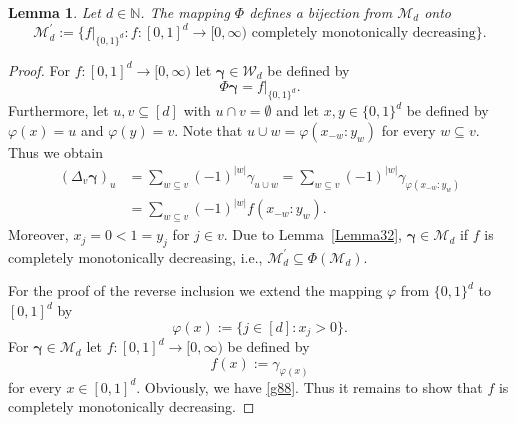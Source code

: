 \documentclass[10pt,a4paper]{amsart}
\newtheorem{lemma}{Lemma}
\newcommand{\M}  {\mathcal{M}}
\newcommand{\N}  {{\mathbb N}}
\newcommand{\W}  {\mathcal{W}}
\newcommand{\bg}{{\boldsymbol{\gamma}}}
\begin{document}
\begin{lemma}\label{Lemma33}
Let $d\in \N$.
The mapping $\Phi$ defines a bijection from $\M_d$ onto 
\[
\M_d^\prime := \{ f|_{\{0,1\}^d} : 
\text{$f \colon [0,1]^d \to {[0,\infty)}$ completely monotonically
decreasing}\}. 
\]
\end{lemma}

\begin{proof}
For $f \colon [0,1]^d \to {[0,\infty)}$ let $\bg \in \W_d$ be
defined by 
\begin{equation}\label{g88}
\Phi \bg  = f|_{\{0,1\}^d}. 
\end{equation}
Furthermore, let $u,v \subseteq [d]$ with $u \cap v = \emptyset$ and
let $x,y \in \{0,1\}^d$ be defined by
$\varphi(x) = u$ and $\varphi(y) = v$.
Note that $u \cup w = \varphi(x_{-w}\!:\!y_w)$ for every $w \subseteq v$. 
Thus we obtain
\begin{align}\label{function_c_m_d_klaus}
\left(\Delta_v \bg \right)_u 
&= 
\sum_{w\subseteq v} (-1)^{|w|} \gamma_{u\cup w} =
\sum_{w\subseteq v} (-1)^{|w|} \gamma_{\varphi(x_{-w}:y_w)}
\nonumber\\
&=
\sum_{w\subseteq v} (-1)^{|w|} f(x_{-w}\!:\!y_w).
\end{align}
Moreover, $x_j = 0 <1 = y_j$ for $j \in v$. 
Due to Lemma~\ref{Lemma32}, $\bg \in \M_d$ 
if $f$ is completely monotonically decreasing, i.e., 
$\M_d^\prime \subseteq \Phi(\M_d)$.

For the proof of the reverse inclusion we extend the mapping
$\varphi$ from $\{0,1\}^d$ to $[0,1]^d$ by
\[
\varphi(x) := \{ j \in [d] : x_j > 0\}.
\]
For $\bg \in \M_d$ let $f \colon [0,1]^d \to {[0,\infty)}$
be defined by 
\[
f(x) := \gamma_{\varphi(x)}
\]
for every $x \in [0,1]^d$. Obviously, we have \eqref{g88}. Thus it
remains to show that $f$ is completely monotonically decreasing.


\end{proof}
\end{document}
